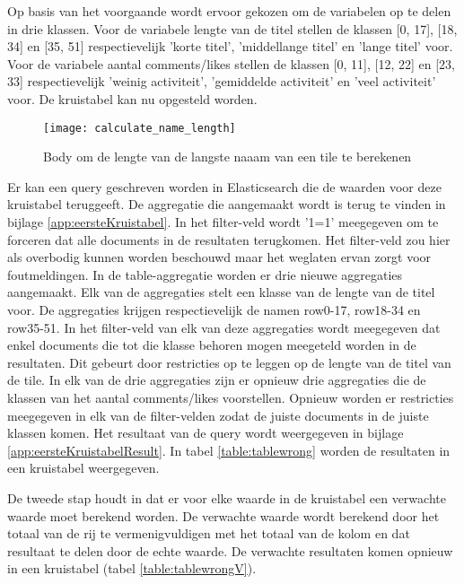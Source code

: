 Op basis van het voorgaande wordt ervoor gekozen om de variabelen op te delen in drie klassen. Voor de variabele lengte van de titel stellen de klassen [0, 17], [18, 34] en [35, 51] respectievelijk 'korte titel', 'middellange titel' en 'lange titel' voor. Voor de variabele aantal comments/likes stellen de klassen [0, 11], [12, 22] en [23, 33] respectievelijk 'weinig activiteit', 'gemiddelde activiteit' en 'veel activiteit' voor. De kruistabel kan nu opgesteld worden.

\begin{figure}
	\centering
	\texttt{[image: calculate\_name\_length]}
	\caption{Body om de lengte van de langste naaam van een tile te berekenen}
	\label{fig:calculatenamelength}
\end{figure}

Er kan een query geschreven worden in Elasticsearch die de waarden voor deze kruistabel teruggeeft. De aggregatie die aangemaakt wordt is terug te vinden in bijlage \ref{app:eersteKruistabel}. In het filter-veld wordt '1=1' meegegeven om te forceren dat alle documents in de resultaten terugkomen. Het filter-veld zou hier als overbodig kunnen worden beschouwd maar het weglaten ervan zorgt voor foutmeldingen. In de table-aggregatie worden er drie nieuwe aggregaties aangemaakt. Elk van de aggregaties stelt een klasse van de lengte van de titel voor. De aggregaties krijgen respectievelijk de namen row0-17, row18-34 en row35-51. In het filter-veld van elk van deze aggregaties wordt meegegeven dat enkel documents die tot die klasse behoren mogen meegeteld worden in de resultaten. Dit gebeurt door restricties op te leggen op de lengte van de titel van de tile. In elk van de drie aggregaties zijn er opnieuw drie aggregaties die de klassen van het aantal comments/likes voorstellen. Opnieuw worden er restricties meegegeven in elk van de filter-velden zodat de juiste documents in de juiste klassen komen. Het resultaat van de query wordt weergegeven in bijlage \ref{app:eersteKruistabelResult}. In tabel \ref{table:tablewrong} worden de resultaten in een kruistabel weergegeven.

De tweede stap houdt in dat er voor elke waarde in de kruistabel een verwachte waarde moet berekend worden. De verwachte waarde wordt berekend door het totaal van de rij te vermenigvuldigen met het totaal van de kolom en dat resultaat te delen door de echte waarde. De verwachte resultaten komen opnieuw in een kruistabel (tabel \ref{table:tablewrongV}).

